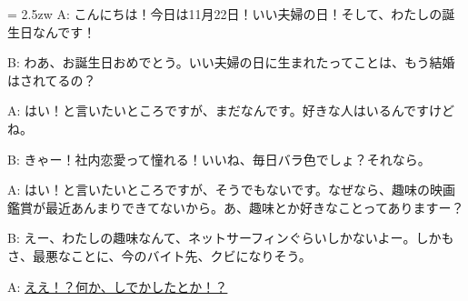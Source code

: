\documentclass[11pt]{amsart}
\title{}
\author{}
\newenvironment{hangall}[1]{\hangindent = 2.5zw\everypar{\hangindent = 2.5zw}}{}
\begin{document}
\maketitle
\begin{hangall}{}%
A: こんにちは！今日は11月22日！いい夫婦の日！そして、わたしの誕生日なんです！

B: わあ、お誕生日おめでとう。いい夫婦の日に生まれたってことは、もう結婚はされてるの？

A: はい！と言いたいところですが、まだなんです。好きな人はいるんですけどね。

B: きゃー！社内恋愛って憧れる！いいね、毎日バラ色でしょ？それなら。

A: はい！と言いたいところですが、そうでもないです。なぜなら、趣味の映画鑑賞が最近あんまりできてないから。あ、趣味とか好きなことってありますー？

B: えー、わたしの趣味なんて、ネットサーフィンぐらいしかないよー。しかもさ、最悪なことに、今のバイト先、クビになりそう。

A: \ul{ええ！？何か、しでかしたとか！？}\end{hangall}
\end{document}
